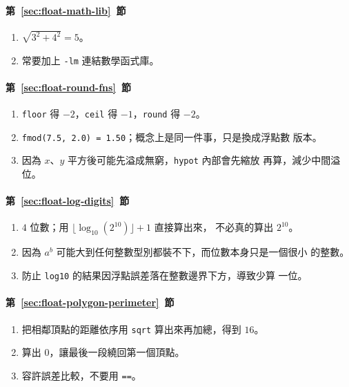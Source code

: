 \paragraph{第~\ref{sec:float-math-lib}~節}
\begin{enumerate}
\item $\sqrt{3^2+4^2} = 5$。
\item 常要加上 \texttt{-lm} 連結數學函式庫。
\end{enumerate}

\paragraph{第~\ref{sec:float-round-fns}~節}
\begin{enumerate}
\item \texttt{floor} 得 $-2$，\texttt{ceil} 得 $-1$，\texttt{round}
得 $-2$。
\item \texttt{fmod(7.5, 2.0) = 1.50}；概念上是同一件事，只是換成浮點數
版本。
\item 因為 $x$、$y$ 平方後可能先溢成無窮，\texttt{hypot} 內部會先縮放
再算，減少中間溢位。
\end{enumerate}

\paragraph{第~\ref{sec:float-log-digits}~節}
\begin{enumerate}
\item $4$ 位數；用 $\lfloor \log_{10}(2^{10}) \rfloor + 1$ 直接算出來，
不必真的算出 $2^{10}$。
\item 因為 $a^b$ 可能大到任何整數型別都裝不下，而位數本身只是一個很小
的整數。
\item 防止 \texttt{log10} 的結果因浮點誤差落在整數邊界下方，導致少算
一位。
\end{enumerate}

\paragraph{第~\ref{sec:float-polygon-perimeter}~節}
\begin{enumerate}
\item 把相鄰頂點的距離依序用 \texttt{sqrt} 算出來再加總，得到 $16$。
\item 算出 $0$，讓最後一段繞回第一個頂點。
\item 容許誤差比較，不要用 \texttt{==}。
\end{enumerate}

